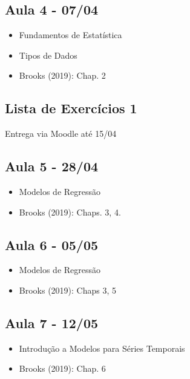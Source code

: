 \documentclass[11pt,]{article}
\providecommand{\tightlist}{%
  \setlength{\itemsep}{0pt}\setlength{\parskip}{0pt}}
\begin{document}
\hypertarget{aula-4---0704}{%
\subsection{Aula 4 - 07/04}\label{aula-4---0704}}

\begin{itemize}
\tightlist
\item
  Fundamentos de Estatística
\item
  Tipos de Dados
\item
  Brooks (2019): Chap. 2
\end{itemize}

\hypertarget{lista-de-exercuxedcios-1}{%
\subsection{Lista de Exercícios 1}\label{lista-de-exercuxedcios-1}}

Entrega via Moodle até 15/04

\hypertarget{aula-5---2804}{%
\subsection{Aula 5 - 28/04}\label{aula-5---2804}}

\begin{itemize}
\tightlist
\item
  Modelos de Regressão
\item
  Brooks (2019): Chaps. 3, 4.
\end{itemize}

\hypertarget{aula-6---0505}{%
\subsection{Aula 6 - 05/05}\label{aula-6---0505}}

\begin{itemize}
\tightlist
\item
  Modelos de Regressão
\item
  Brooks (2019): Chaps 3, 5
\end{itemize}

\hypertarget{aula-7---1205}{%
\subsection{Aula 7 - 12/05}\label{aula-7---1205}}

\begin{itemize}
\tightlist
\item
  Introdução a Modelos para Séries Temporais
\item
  Brooks (2019): Chap. 6
\end{itemize}
\end{document}
